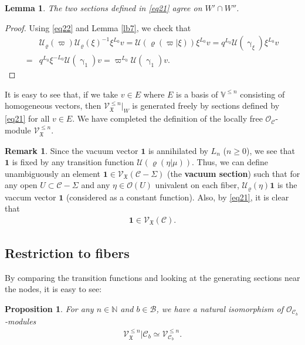 \documentclass[12pt,a4paper,notitlepage]{article}
\theoremstyle{definition}
\newtheorem{rem}[df]{Remark}
\theoremstyle{plain}
\newtheorem{pp}[df]{Proposition}
\newtheorem{lm}[df]{Lemma}
\newcommand{\fk}{\mathfrak}
\newcommand{\mc}{\mathcal}
\newcommand{\id}{\mathbf{1}}
\newcommand{\scr}{\mathscr}
\newcommand{\Vbb}{\mathbb V}
\newcommand{\Nbb}{\mathbb N}
\numberwithin{equation}{section}
\begin{document}
\begin{lm}
	The two sections defined in \eqref{eq21} agree on $W'\cap W''$.
\end{lm}


\begin{proof}
Using   \eqref{eq22} and Lemma \ref{lb7}, we check that
	\begin{align*}
	&\mc U_\varrho(\varpi)\mc U_\varrho(\xi)^{-1}\xi^{L_0}v=\mc U(\varrho(\varpi|\xi))\xi^{L_0}v=q^{L_0}\mc U(\upgamma_{\xi})\xi^{L_0}v\\
	=&q^{L_0}\xi^{-L_0}\mc U(\upgamma_1)v=\varpi^{L_0}\mc U(\upgamma_1)v.
	\end{align*}
\end{proof}

It is easy to see that, if we take $v\in E$ where $E$ is a basis of $\Vbb^{\leq n}$ consisting of homogeneous vectors, then $\scr V_{\fk X}^{\leq n}|_{W}$ is generated freely by sections defined by \eqref{eq21} for all $v\in E$. We have completed the definition of the  locally free $\scr O_{\mc C}$-module $\scr V_{\fk X}^{\leq n}$.



\begin{rem}
Since the vacuum vector $\id$ is annihilated by $L_n$ ($n\geq 0$), we see that $\id$ is fixed by any transition function $\mc U(\varrho(\eta|\mu))$. Thus, we can define unambiguously an element $\id\in\scr V_{\fk X}(\mc C-\Sigma)$ (the \textbf{vacuum section}) such that for any open $U\subset\mc C-\Sigma$ and any $\eta\in\scr O(U)$ univalent on each fiber, $\mc U_\varrho(\eta)\id$ is the vaccum vector $\id$ (considered as a constant function). \index{1@$\id$} Also, by \eqref{eq21}, it is clear that
\begin{align*}
	\id\in\scr V_{\fk X}(\mc C).
\end{align*}
\end{rem}





\subsection*{Restriction to fibers}


By comparing the transition functions and looking at the generating sections near the nodes, it is easy to see:

\begin{pp}\label{lb10}
For any $n\in\Nbb$ and $b\in\mc B$, we have a natural isomorphism of $\scr O_{\mc C_b}$-modules
\begin{align*}
\scr V_{\fk X}^{\leq n}|\mc C_b\simeq\scr V_{\mc C_b}^{\leq n}.
\end{align*}
\end{pp}
\end{document}
